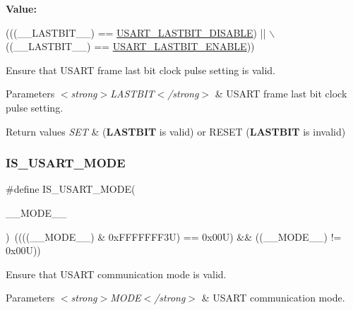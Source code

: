 {\bfseries Value\+:}
\begin{DoxyCode}
(((\_\_LASTBIT\_\_) == \hyperlink{group___u_s_a_r_t___last___bit_gac96499244ffa44ff6fa739da9cc9d53f}{USART\_LASTBIT\_DISABLE}) || \(\backslash\)
                                       ((\_\_LASTBIT\_\_) == \hyperlink{group___u_s_a_r_t___last___bit_gae851e2151668c666028dc10f20f4f676}{USART\_LASTBIT\_ENABLE}))
\end{DoxyCode}


Ensure that U\+S\+A\+RT frame last bit clock pulse setting is valid. 


\begin{DoxyParams}{Parameters}
{\em $<$strong$>$\+L\+A\+S\+T\+B\+I\+T$<$/strong$>$} & U\+S\+A\+RT frame last bit clock pulse setting. \\
\hline
\end{DoxyParams}

\begin{DoxyRetVals}{Return values}
{\em S\+ET} & ({\bfseries L\+A\+S\+T\+B\+IT} is valid) or R\+E\+S\+ET ({\bfseries L\+A\+S\+T\+B\+IT} is invalid) \\
\hline
\end{DoxyRetVals}
\mbox{\label{group___u_s_a_r_t___private___macros_ga1ce858404f8b2b6befe4b920cc20e5c9}} 
\subsubsection{\texorpdfstring{I\+S\+\_\+\+U\+S\+A\+R\+T\+\_\+\+M\+O\+DE}{IS\_USART\_MODE}}
{\footnotesize\ttfamily \#define I\+S\+\_\+\+U\+S\+A\+R\+T\+\_\+\+M\+O\+DE(\begin{DoxyParamCaption}\item[{}]{\+\_\+\+\_\+\+M\+O\+D\+E\+\_\+\+\_\+ }\end{DoxyParamCaption})~((((\+\_\+\+\_\+\+M\+O\+D\+E\+\_\+\+\_\+) \& 0x\+F\+F\+F\+F\+F\+F\+F3\+U) == 0x00\+U) \&\& ((\+\_\+\+\_\+\+M\+O\+D\+E\+\_\+\+\_\+) != 0x00\+U))}



Ensure that U\+S\+A\+RT communication mode is valid. 


\begin{DoxyParams}{Parameters}
{\em $<$strong$>$\+M\+O\+D\+E$<$/strong$>$} & U\+S\+A\+RT communication mode. \\
\hline
\end{DoxyParams}

